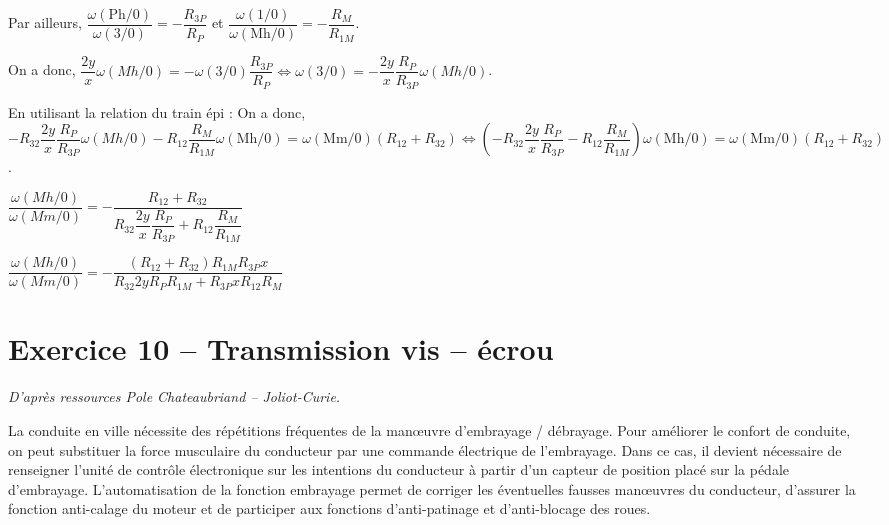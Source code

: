 \documentclass[10pt,fleqn]{article} %
\begin{document}
\begin{multicols}{2}
\begin{multicols}{2}
\begin{corrige}
Par ailleurs, $\dfrac{\omega(\text{Ph}/0)}{\omega(3/0)} = -\dfrac{R_{3P}}{R_P}$ et 
$\dfrac{\omega(1/0)}{\omega(\text{Mh}/0)} = -\dfrac{R_M}{R_{1M}}$.

On a donc, $ \dfrac{2y}{x} \omega(Mh/0)= -\omega(3/0)\dfrac{R_{3P}}{R_P} \Leftrightarrow  \omega(3/0) = -\dfrac{2y}{x} \dfrac{R_P}{R_{3P}}\omega(Mh/0)$.

En utilisant la relation du train épi :
On a donc, $-R_{32} \dfrac{2y}{x} \dfrac{R_P}{R_{3P}}\omega(Mh/0)  -R_{12} \dfrac{R_M}{R_{1M}} \omega(\text{Mh}/0) = \omega(\text{Mm}/0)\left(R_{12}+R_{32}\right) \Leftrightarrow \left(-R_{32} \dfrac{2y}{x} \dfrac{R_P}{R_{3P}}  -R_{12} \dfrac{R_M}{R_{1M}} \right)\omega(\text{Mh}/0) = \omega(\text{Mm}/0)\left(R_{12}+R_{32}\right)$.


$\dfrac{\omega(Mh/0)}{\omega(Mm/0)}=-\dfrac{R_{12}+R_{32}}{R_{32} \dfrac{2y}{x} \dfrac{R_P}{R_{3P}}  +R_{12} \dfrac{R_M}{R_{1M}}}$

$\dfrac{\omega(Mh/0)}{\omega(Mm/0)}=-\dfrac{\left( R_{12}+R_{32}\right)R_{1M} R_{3P}x }{R_{32} 2y R_PR_{1M} + R_{3P}xR_{12} R_M}$
\end{corrige}
\else
\fi
%
%

\section*{Exercice 10 -- Transmission vis -- écrou}
\textit{D'après ressources Pole Chateaubriand -- Joliot-Curie.}
\setcounter{exo}{0}

La conduite en ville nécessite des répétitions
fréquentes de la manœuvre d’embrayage /
débrayage. Pour améliorer le confort de conduite,
on peut substituer la force musculaire du
conducteur par une commande électrique de
l’embrayage. Dans ce cas, il devient nécessaire de
renseigner l’unité de contrôle électronique sur les
intentions du conducteur à partir d’un capteur de
position placé sur la pédale d’embrayage.
L’automatisation de la fonction embrayage
permet de corriger les éventuelles fausses
manœuvres du conducteur, d’assurer la fonction
anti-calage du moteur et de participer aux
fonctions d’anti-patinage et d’anti-blocage des
roues.


\end{multicols}
\end{multicols}
\end{document}
